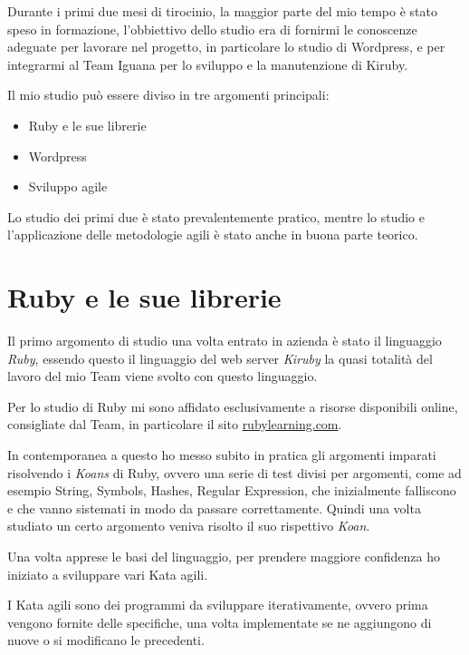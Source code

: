 


Durante i primi due mesi di tirocinio, la maggior parte del mio tempo è stato speso in formazione,
l'obbiettivo dello studio era di fornirmi le conoscenze adeguate per lavorare nel progetto, in particolare lo studio
di Wordpress, e per integrarmi al Team Iguana per lo sviluppo e la manutenzione di Kiruby.


Il mio studio può essere diviso in tre argomenti principali:
\begin{itemize}
\item Ruby e le sue librerie
\item Wordpress
\item Sviluppo agile
\end{itemize}

Lo studio dei primi due è stato prevalentemente pratico, mentre lo studio e l'applicazione
delle metodologie agili è stato anche in buona parte teorico.

\section{Ruby e le sue librerie}

Il primo argomento di studio una volta entrato in azienda è stato il linguaggio \emph{Ruby}, essendo questo il
linguaggio del web server \emph{Kiruby} la quasi totalità del lavoro del mio Team viene svolto con questo linguaggio.

Per lo studio di Ruby mi sono affidato esclusivamente a risorse disponibili online, consigliate dal Team,
in particolare il sito \url{rubylearning.com}\cite{RUBY}.

In contemporanea a questo ho messo subito in pratica gli argomenti imparati risolvendo i \emph{Koans}\cite{KOANS}
di Ruby, ovvero una serie di test divisi per argomenti, come ad esempio String, Symbols, Hashes, Regular Expression, 
che inizialmente falliscono e che vanno sistemati in modo da passare correttamente. Quindi una volta studiato un certo argomento
veniva risolto il suo rispettivo \emph{Koan}. 

Una volta apprese le basi del linguaggio, per prendere maggiore confidenza ho iniziato a sviluppare
vari Kata agili.

I Kata agili sono dei programmi da sviluppare iterativamente, ovvero prima vengono fornite delle specifiche, una volta 
implementate se ne aggiungono di nuove o si modificano le precedenti. 

